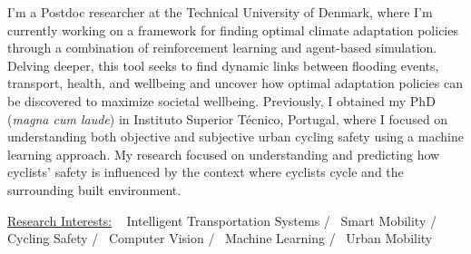 

\begin{cvparagraph}

I'm a Postdoc researcher at the Technical University of Denmark, where I'm currently working on a framework for finding optimal climate adaptation policies through a combination of reinforcement learning and agent-based simulation. Delving deeper, this tool seeks to find dynamic links between flooding events, transport, health, and wellbeing and uncover how optimal adaptation policies can be discovered to maximize societal wellbeing. Previously, I obtained my PhD (\textit{magna cum laude}) in Instituto Superior Técnico, Portugal, where I focused on understanding both objective and subjective urban cycling safety using a machine learning approach. My research focused on understanding and predicting how cyclists' safety is influenced by the context where cyclists cycle and the surrounding built environment. 


\end{cvparagraph}
\vspace{-1.ex}\begin{cvtechnologies}
\underline{Research Interests:} ~
 Intelligent Transportation Systems /~
 Smart Mobility /~
 Cycling Safety /~
 Computer Vision /~
 Machine Learning /~
 Urban Mobility
\end{cvtechnologies}
